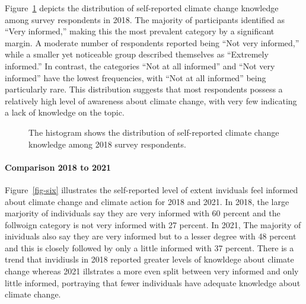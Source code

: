 \documentclass[
  letterpaper,
  DIV=11,
  numbers=noendperiod]{scrartcl}
\let\oldparagraph\paragraph
\renewcommand{\paragraph}[1]{\oldparagraph{#1}\mbox{}}
\begin{document}
Figure~\ref{fig-five} depicts the distribution of self-reported climate
change knowledge among survey respondents in 2018. The majority of
participants identified as ``Very informed,'' making this the most
prevalent category by a significant margin. A moderate number of
respondents reported being ``Not very informed,'' while a smaller yet
noticeable group described themselves as ``Extremely informed.'' In
contrast, the categories ``Not at all informed'' and ``Not very
informed'' have the lowest frequencies, with ``Not at all informed''
being particularly rare. This distribution suggests that most
respondents possess a relatively high level of awareness about climate
change, with very few indicating a lack of knowledge on the topic.

\begin{figure}


\caption{\label{fig-five}The histogram shows the distribution of
self-reported climate change knowledge among 2018 survey respondents.}

\end{figure}%

\paragraph{Comparison 2018 to 2021}\label{comparison-2018-to-2021-2}

Figure~\ref{fig-six} illustrates the self-reported level of extent
inviduals feel informed about climate change and climate action for 2018
and 2021. In 2018, the large marjority of individuals say they are very
informed with 60 percent and the follwoign category is not very informed
with 27 percent. In 2021, The majority of inividuals also say they are
very informed but to a lesser degree with 48 percent and this is closely
followed by only a little informed with 37 percent. There is a trend
that invidiusls in 2018 reported greater levels of knowldege about
climate change whereas 2021 illstrates a more even split between very
informed and only little informed, portraying that fewer individuals
have adequate knowledge about climate change.
\end{document}
